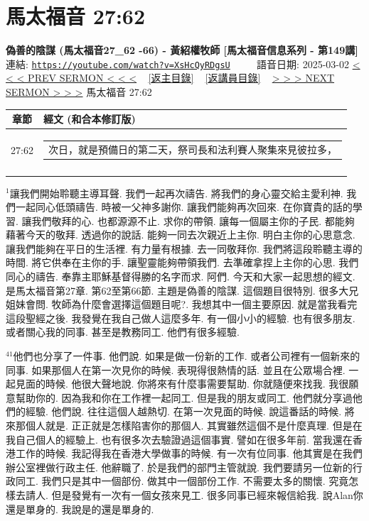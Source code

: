 \documentclass{book}
\begin{document}
\section{馬太福音 27:62}
\label{sec:XsHcQyRDgsU}
\textbf{偽善的陰謀 (馬太福音27\_62 -66) - 黃紹權牧師  [馬太福音信息系列 - 第149講]}
\newline
\newline
連結: \href{https://youtube.com/watch?v=XsHcQyRDgsU}{\texttt{https://youtube.com/watch?v=XsHcQyRDgsU}} ~~~~ 語音日期: 2025-03-02
\newline
\newline
\hyperref[sec:MfR5_HAo14I]{< < < PREV SERMON < < <}
~
\hyperlink{toc}{[返主目錄]}
~
\hyperref[ch:preacher18]{[返講員目錄]}
~
\hyperref[sec:FPn17JgDaFk]{> > > NEXT SERMON > > >}
\newline
\newline
馬太福音 27:62
\newline
\begin{longtable}{cl}
\hline
\hline
章節 & 經文 (和合本修訂版)\\
\hline
27:62 & \begin{tabularx}{0.7\textwidth}{X} 次日，就是預備日的第二天，祭司長和法利賽人聚集來見彼拉多， \end{tabularx} \\ \\
[1ex]
\hline
\hline
\end{longtable}
$^{1}$讓我們開始聆聽主導耳聲.
我們一起再次禱告.
將我們的身心靈交給主愛利神.
我們一起同心低頭禱告.
時被一父神多謝你.
讓我們能夠再次回來.
在你寶貴的話的學習.
讓我們敬拜的心.
也都源源不止.
求你的帶領.
讓每一個屬主你的子民.
都能夠藉著今天的敬拜.
透過你的說話.
能夠一同去次親近上主你.
明白主你的心思意念.
讓我們能夠在平日的生活裡.
有力量有根據.
去一同敬拜你.
我們將這段聆聽主導的時間.
將它供奉在主你的手.
讓聖靈能夠帶領我們.
去準確拿捏上主你的心思.
我們同心的禱告.
奉靠主耶穌基督得勝的名字而求.
阿們.
今天和大家一起思想的經文.
是馬太福音第27章.
第62至第66節.
主題是偽善的陰謀.
這個題目很特別.
很多大兄姐妹會問.
牧師為什麼會選擇這個題目呢?.
我想其中一個主要原因.
就是當我看完這段聖經之後.
我發覺在我自己做人這麼多年.
有一個小小的經驗.
也有很多朋友.
或者關心我的同事.
甚至是教務同工.
他們有很多經驗.

$^{41}$他們也分享了一件事.
他們說.
如果是做一份新的工作.
或者公司裡有一個新來的同事.
如果那個人在第一次見你的時候.
表現得很熱情的話.
並且在公眾場合裡.
一起見面的時候.
他很大聲地說.
你將來有什麼事需要幫助.
你就隨便來找我.
我很願意幫助你的.
因為我和你在工作裡一起同工.
但是我的朋友或同工.
他們就分享過他們的經驗.
他們說.
往往這個人越熱切.
在第一次見面的時候.
說這番話的時候.
將來那個人就是.
正正就是怎樣陷害你的那個人.
其實雖然這個不是什麼真理.
但是在我自己個人的經驗上.
也有很多次去驗證過這個事實.
譬如在很多年前.
當我還在香港工作的時候.
我記得我在香港大學做事的時候.
有一次有位同事.
他其實是在我們辦公室裡做行政主任.
他辭職了.
於是我們的部門主管就說.
我們要請另一位新的行政同工.
我們只是其中一個部份.
做其中一個部份工作.
不需要太多的關懷.
究竟怎樣去請人.
但是發覺有一次有一個女孩來見工.
很多同事已經來報信給我.
說Alan你還是單身的.
我說是的還是單身的.
\end{document}
